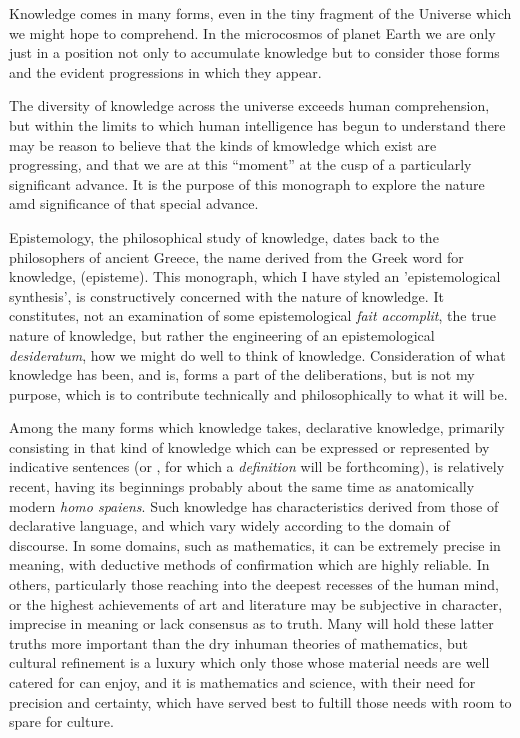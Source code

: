 Knowledge comes in many forms, even in the tiny fragment of the Universe which we might hope to comprehend.
In the microcosmos of planet Earth we are only just in a position not only to accumulate knowledge but to consider those forms and the evident progressions in which they appear.

The diversity of knowledge across the universe exceeds human comprehension, but within the limits to which human intelligence has begun to understand there may be reason to believe that the kinds of kmowledge which exist are progressing, and that we are at this ``moment'' at the cusp of a particularly significant advance.
It is the purpose of this monograph to explore the nature amd significance of that special advance.

Epistemology, the philosophical study of knowledge, dates back to the phi\-lo\-so\-phers of ancient Greece, the name derived from the Greek word for knowledge,  (episteme).
This monograph, which I have styled an 'epistemological synthesis', is constructively concerned with the nature of knowledge.
It constitutes, not an examination of some epistemological \emph{fait accomplit}, the true nature of knowledge, but rather the engineering of an epistemological \emph{desideratum}, how we might do well to think of knowledge.
Consideration of what knowledge has been, and is, forms a part of the deliberations, but is not my purpose, which is to contribute technically and philosophically to what it will be.

Among the many forms which knowledge takes, declarative knowledge, primarily consisting in that kind of knowledge which can be expressed or represented by indicative sentences (or , for which a \emph{definition} will be forthcoming), is relatively recent, having its beginnings probably about the same time as anatomically modern \emph{homo spaiens}.
Such knowledge has characteristics derived from those of declarative language, and which vary widely according to the domain of discourse.
In some domains, such as mathematics, it can be extremely precise in meaning, with deductive methods of confirmation which are highly reliable.
In others, particularly those reaching into the deepest recesses of the human mind, or the highest achievements of art and literature may be subjective in character, imprecise in meaning or lack consensus as to truth.
Many will hold these latter truths more important than the dry inhuman theories of mathematics, but cultural refinement is a luxury which only those whose material needs are well catered for can enjoy, and it is mathematics and science, with their need for precision and certainty, which have served best to fultill those needs with room to spare for culture.

